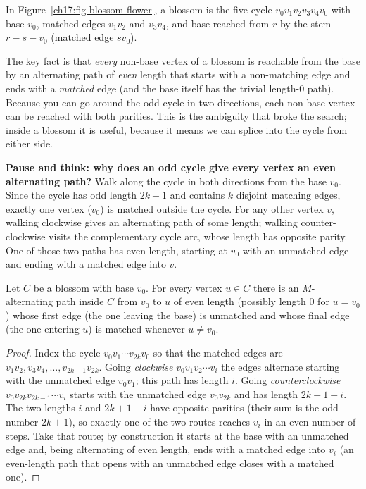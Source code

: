 In Figure~\ref{ch17:fig-blossom-flower}, a blossom is the five-cycle $v_0 v_1 v_2 v_3 v_4 v_0$ with base $v_0$, matched edges $v_1v_2$ and
$v_3v_4$, and base reached from $r$ by the stem $r\!-\!s\!-\!v_0$ (matched edge $s v_0$).

The key fact is that \emph{every} non-base vertex of a blossom is reachable
from the base by an alternating path of \emph{even} length that starts with a non-matching edge and ends with a \emph{matched} edge (and the base itself has the trivial length-$0$ path). Because
you can go around the odd cycle in two directions, each non-base vertex can be reached with both parities.
This is the ambiguity that broke the search; inside a blossom it is useful, because it means we
can splice into the cycle from either side.

\begin{recoverybox}
\textbf{Pause and think: why does an odd cycle give every vertex an even alternating path?}
Walk along the cycle in both directions from the base $v_0$. Since the cycle has odd length $2k+1$ and contains $k$ disjoint matching edges, exactly one vertex ($v_0$) is matched outside the cycle. For any other vertex $v$, walking clockwise gives an alternating path of some length; walking counter-clockwise visits the complementary cycle arc, whose length has opposite parity. One of those two paths has even length, starting at $v_0$ with an unmatched edge and ending with a matched edge into $v$.
\end{recoverybox}

\begin{lemma}
\label{ch17:lem-blossom-even}
Let $C$ be a blossom with base $v_0$. For every vertex $u\in C$ there is an $M$-alternating path
inside $C$ from $v_0$ to $u$ of even length (possibly length $0$ for $u=v_0$) whose first edge (the
one leaving the base) is unmatched and whose final edge (the one entering $u$) is matched whenever
$u\neq v_0$.
\end{lemma}

\begin{proof}
Index the cycle $v_0 v_1 \cdots v_{2k} v_0$ so that the matched edges are
$v_1 v_2, v_3 v_4, \dots, v_{2k-1} v_{2k}$. Going \emph{clockwise} $v_0 v_1 v_2 \cdots v_i$ the edges
alternate starting with the unmatched edge $v_0 v_1$; this path has length $i$. Going
\emph{counterclockwise} $v_0 v_{2k} v_{2k-1}\cdots v_i$ starts with the unmatched edge $v_0 v_{2k}$
and has length $2k+1-i$. The two lengths $i$ and $2k+1-i$ have opposite parities (their sum is the odd
number $2k+1$), so exactly one of the two routes reaches $v_i$ in an even number of steps. Take that
route; by construction it starts at the base with an unmatched edge and, being alternating of even
length, ends with a matched edge into $v_i$ (an even-length path that opens with an unmatched edge
closes with a matched one).
\end{proof}


